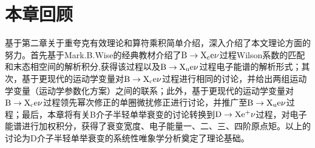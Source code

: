 \section{本章回顾}
基于第二章关于重夸克有效理论和算符乘积简单介绍，深入介绍了本文理论方面的努力。首先基于Mark.B.Wise的经典教材介绍了$\mathrm{\mathrm{B}\to X_{c}e\nu}$过程Wilson系数的匹配和末态相空间的解析积分,获得该过程以及$\mathrm{\mathrm{B}\to X_{u}e\nu}$过程电子能谱的解析形式；其次，基于更现代的运动学变量对$\mathrm{\mathrm{B}\to X_{c}e\nu}$过程进行相同的讨论，并给出两组运动学变量（运动学参数化方案）之间的联系；此外，基于更现代的运动学变量对$\mathrm{\mathrm{B}\to X_{c}e\nu}$过程领先幂次修正的单圈微扰修正进行讨论，并推广至$\mathrm{\mathrm{B}\to X_{u}e\nu}$过程；最后，本章将有关B介子半轻单举衰变的讨论转换到$\mathrm{D\to X e^{+}\nu}$过程，对电子能谱进行加权积分，获得了衰变宽度、电子能量一、二、三、四阶原点矩。以上的讨论为D介子半轻单举衰变的系统性唯象学分析奠定了理论基础。
